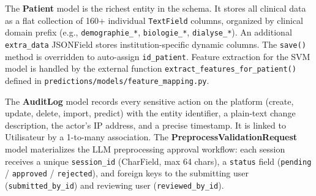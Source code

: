 \documentclass[12pt,a4paper,twoside]{report}
\begin{document}
The \textbf{Patient} model is the richest entity in the schema. It stores all clinical data as a flat collection of 160+ individual \texttt{TextField} columns, organized by clinical domain prefix (e.g., \texttt{demographie\_*}, \texttt{biologie\_*}, \texttt{dialyse\_*}). An additional \texttt{extra\_data} JSONField stores institution-specific dynamic columns. The \texttt{save()} method is overridden to auto-assign \texttt{id\_patient}. Feature extraction for the SVM model is handled by the external function \texttt{extract\_features\_for\_patient()} defined in \texttt{predictions/models/feature\_mapping.py}.

The \textbf{AuditLog} model records every sensitive action on the platform (create, update, delete, import, predict) with the entity identifier, a plain-text change description, the actor's IP address, and a precise timestamp. It is linked to Utilisateur by a 1-to-many association. The \textbf{PreprocessValidationRequest} model materializes the LLM preprocessing approval workflow: each session receives a unique \texttt{session\_id} (CharField, max 64 chars), a \texttt{status} field (\texttt{pending} / \texttt{approved} / \texttt{rejected}), and foreign keys to the submitting user (\texttt{submitted\_by\_id}) and reviewing user (\texttt{reviewed\_by\_id}).
\end{document}
